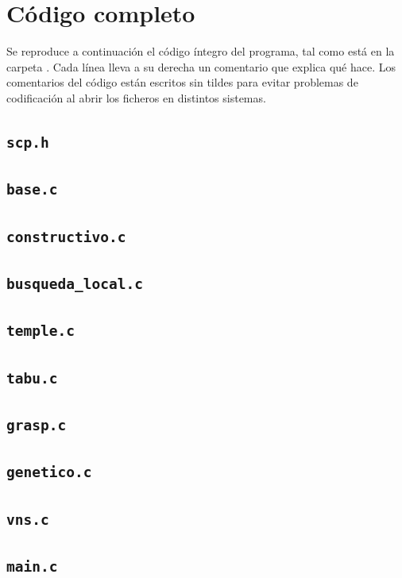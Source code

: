 \section{Código completo}\label{sec:codigo}

Se reproduce a continuación el código íntegro del programa, tal como está en la carpeta
. Cada línea lleva a su derecha un comentario que explica qué hace. Los
comentarios del código están escritos sin tildes para evitar problemas de codificación al
abrir los ficheros en distintos sistemas.

\newcommand{\listado}[2]{\subsection{\texttt{#1}}}
\listado{scp.h}{scp.h}
\listado{base.c}{base.c}
\listado{constructivo.c}{constructivo.c}
\listado{busqueda\_local.c}{busqueda_local.c}
\listado{temple.c}{temple.c}
\listado{tabu.c}{tabu.c}
\listado{grasp.c}{grasp.c}
\listado{genetico.c}{genetico.c}
\listado{vns.c}{vns.c}
\listado{main.c}{main.c}
